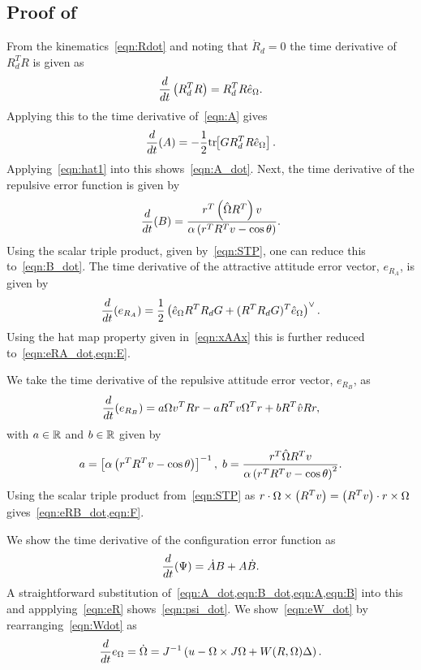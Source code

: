 \documentclass[10pt,fleqn]{IJCAS}  %
\begin{document}
\begin{multicols}{2}
\subsection{Proof of~}\label{proof:error_dyn}
From the kinematics~\cref{eqn:Rdot} and noting that \( \dot{R}_d = 0 \) the time derivative of \( R_d^T R \) is given as
\begin{gather*}
	\frac{d }{d t} \left( R_d^T R \right) = R_d^T R \hat{e}_\Omega .
\end{gather*}
Applying this to the time derivative of~\cref{eqn:A} gives
\begin{gather*}
	\frac{d }{d t} (A) = -\frac{1}{2} \mathrm{tr}\negthickspace\left[ G R_d^T R \hat{e}_\Omega \right] .
\end{gather*}
Applying~\cref{eqn:hat1} into this shows~\cref{eqn:A_dot}.
Next, the time derivative of the repulsive error function is given by
\begin{gather*}
	\frac{d }{d t} (B) = \frac{r^T \left( \hat{\Omega} R^T \right) v}{\alpha \left( r^T R^T v - \cos \theta \right)} .
\end{gather*}
Using the scalar triple product, given by~\cref{eqn:STP}, one can reduce this to~\cref{eqn:B_dot}.
The time derivative of the attractive attitude error vector, \( e_{R_A} \), is given by
\begin{gather*}
	\frac{d }{d t} ( e_{R_A}) = \frac{1}{2} \left( \hat{e}_\Omega R^T R_d G + (R^T R_d G)^T \hat{e}_\Omega \right)^\vee .
\end{gather*}
Using the hat map property given in~\cref{eqn:xAAx} this is further reduced to~\cref{eqn:eRA_dot,eqn:E}.

We take the time derivative of the repulsive attitude error vector, \( e_{R_B} \), as
\begin{gather*}
	\frac{d }{d t}( e_{R_B} )= a \Omega v^T R r - a R^T v \Omega^T r + b R^T \hat{v} R r ,
\end{gather*}
with \( a \in \mathbb{R} \) and \( b \in \mathbb{R}\) given by 
\begin{gather*}
	a = \left[ \alpha \left( r^T R^T v - \cos \theta \right) \right]^{-1} , \;
	b = \frac{r^T \hat{\Omega} R^T v}{\alpha \left( r^T R^T v - \cos \theta \right)^2} .
\end{gather*}
Using the scalar triple product from~\cref{eqn:STP} as \( r \cdot \Omega \times \left( R^T v \right) = \left( R^T v \right) \cdot r \times \Omega \) gives~\cref{eqn:eRB_dot,eqn:F}.

We show the time derivative of the configuration error function as
\begin{gather*}
	\frac{d }{d t} (\Psi) = \dot{A} B + A \dot{B} .
\end{gather*}
A straightforward substitution of~\cref{eqn:A_dot,eqn:B_dot,eqn:A,eqn:B} into this and appplying~\cref{eqn:eR} shows~\cref{eqn:psi_dot}.
We show~\cref{eqn:eW_dot} by rearranging~\cref{eqn:Wdot} as 
\begin{align*}
	\frac{d }{d t} e_\Omega = \dot{\Omega} = J^{-1} \left( u - \Omega \times J \Omega + W(R,\Omega) \Delta  \right) .
\end{align*}


\end{multicols}
\end{document}
